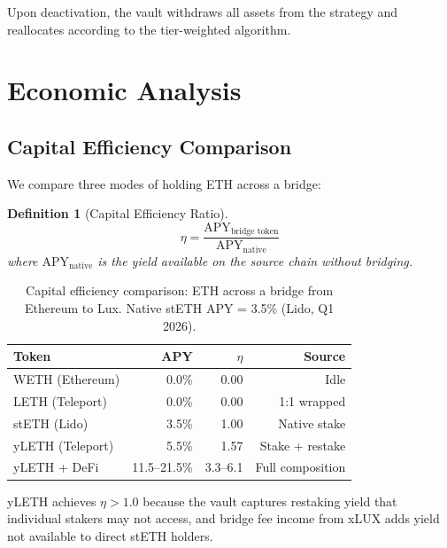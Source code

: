 \documentclass[11pt,twocolumn]{article}
\newtheorem{definition}{Definition}[section]
\begin{document}
Upon deactivation, the vault withdraws all assets from the strategy and reallocates according to the tier-weighted algorithm.

\section{Economic Analysis}\label{sec:economics}

\subsection{Capital Efficiency Comparison}

We compare three modes of holding ETH across a bridge:

\begin{definition}[Capital Efficiency Ratio]
\begin{equation}\label{eq:capital_efficiency}
  \eta = \frac{\text{APY}_{\text{bridge token}}}{\text{APY}_{\text{native}}}
\end{equation}
where $\text{APY}_{\text{native}}$ is the yield available on the source chain without bridging.
\end{definition}

\begin{table}[ht]
\centering
\small
\caption{Capital efficiency comparison: ETH across a bridge from Ethereum to Lux. Native stETH APY = 3.5\% (Lido, Q1 2026).}
\label{tab:capital_efficiency}
\begin{tabular}{@{}lrrr@{}}
\toprule
\textbf{Token} & \textbf{APY} & \textbf{$\eta$} & \textbf{Source} \\
\midrule
WETH (Ethereum) & 0.0\% & 0.00 & Idle \\
LETH (Teleport) & 0.0\% & 0.00 & 1:1 wrapped \\
stETH (Lido) & 3.5\% & 1.00 & Native stake \\
yLETH (Teleport) & 5.5\% & 1.57 & Stake + restake \\
yLETH + DeFi & 11.5--21.5\% & 3.3--6.1 & Full composition \\
\bottomrule
\end{tabular}
\end{table}

\noindent
yLETH achieves $\eta > 1.0$ because the vault captures restaking yield that individual stakers may not access, and bridge fee income from xLUX adds yield not available to direct stETH holders.
\end{document}
